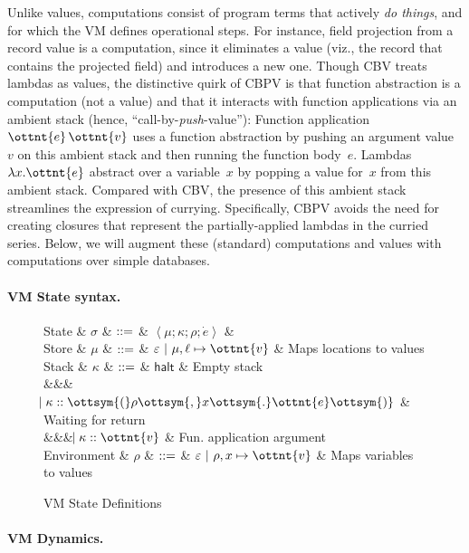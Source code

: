 Unlike values, computations consist of program terms that actively
\emph{do things}, and for which the VM defines operational steps. For
instance, field projection from a record value is a computation, since
it eliminates a value (viz., the record that contains the projected
field) and introduces a new one.
%
Though CBV treats lambdas as values, the distinctive quirk of CBPV is
that function abstraction is a computation (not a value) and that it
interacts with function applications via an ambient stack (hence,
``call-by-\emph{push}-value''):
%
Function application~$\ottnt{e} \, \ottnt{v}$ uses a function abstraction by pushing
an argument value~$v$ on this ambient stack and then running the
function body~$e$.
%
Lambdas~$ \lambda  x .  \ottnt{e} $ abstract over a variable~$x$ by popping a value
for~$x$ from this ambient stack.
%
Compared with CBV, the presence of this ambient stack streamlines the
expression of currying.
%
Specifically, CBPV avoids the need for creating closures that
represent the partially-applied lambdas in the curried series.
%
Below, we will augment these (standard) computations and values with
computations over simple databases.

\paragraph{VM State syntax.}

\begin{figure}
  \begin{grammar}
    State
    & $\sigma$ & $\mathrel{::=}$ & $ \left<  \mu ;  \kappa ;  \rho ;  \dot{e}  \right> $ &
    \\
    Store
    & $\mu$ & $\mathrel{::=}$ & $\varepsilon~|~ \mu  ,  \ell \mapsto \ottnt{v} $ & Maps locations to values
    \\
    Stack
    & $\kappa$ & $\mathrel{::=}$ & $ \textsf{halt} $ & Empty stack
    \\
    &&& $\bnfaltbrk \kappa  ::  \ottsym{(}  \rho  \ottsym{,}  x  \ottsym{.}  \ottnt{e}  \ottsym{)}$ & Waiting for return
    \\
    &&& $\bnfaltbrk \kappa  ::  \ottnt{v}$ & Fun. application argument
    \\
    Environment
    & $\rho$   & $\mathrel{::=}$ & $\varepsilon~|~ \rho  ,  x \mapsto \ottnt{v} $ & Maps variables to values
  \end{grammar}
  \caption{VM State Definitions}
  \label{fig:state}
\end{figure}


\paragraph{VM Dynamics.}


